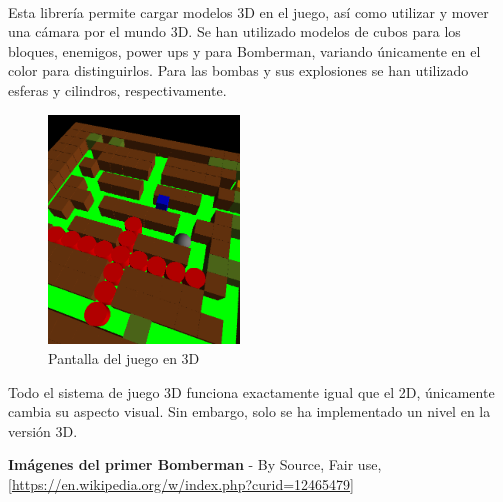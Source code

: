 \documentclass[a4paper]{article}
\begin{document}
\paragraph{}Esta librería permite cargar modelos 3D en el juego, así como utilizar y mover una cámara por el mundo 3D. Se han utilizado modelos de cubos para los bloques, enemigos, power ups y para Bomberman, variando únicamente en el color para distinguirlos. Para las bombas y sus explosiones se han utilizado esferas y cilindros, respectivamente.
\begin{figure}[H]
	\centering
	\includegraphics[width=2in]{bombermantresdes.png}
	\caption{Pantalla del juego en 3D}
	\label{fig:tresdes}
\end{figure}
Todo el sistema de juego 3D funciona exactamente igual que el 2D, únicamente cambia su aspecto visual. Sin embargo, solo se ha implementado un nivel en la versión 3D.
\newpage
\begin{thebibliography}{99} 
 \textbf{Imágenes del primer Bomberman} - By Source, Fair use, [\url{https://en.wikipedia.org/w/index.php?curid=12465479}]

\end{thebibliography}
\end{document}
